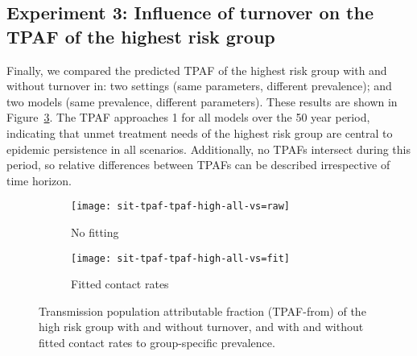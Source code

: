 \subsection{Experiment 3: Influence of turnover on the TPAF of the highest risk group}
\label{ss:res-tpaf}
Finally, we compared the predicted TPAF of the highest risk group with and without turnover in:
two settings (same parameters, different prevalence); and
two models (same prevalence, different parameters).
These results are shown in Figure~\ref{fig:tpaf}.
The TPAF approaches 1 for all models over the 50 year period,
indicating that unmet treatment needs of the highest risk group
are central to epidemic persistence in all scenarios.
Additionally, no TPAFs intersect during this period,
so relative differences between TPAFs can be described irrespective of time horizon.
\begin{figure}[!tbp]
  \centering
  \begin{subfigure}{0.45\linewidth}
    \centering
    \texttt{[image: sit-tpaf-tpaf-high-all-vs=raw]}
    \caption{No fitting}
    \label{fig:tpaf-raw}
  \end{subfigure}
  \begin{subfigure}{0.45\linewidth}
    \centering
    \texttt{[image: sit-tpaf-tpaf-high-all-vs=fit]}
    \caption{Fitted contact rates}
    \label{fig:tpaf-fit}
  \end{subfigure}
  \caption{Transmission population attributable fraction (TPAF-from)
    of the high risk group with and without turnover,
    and with and without fitted contact rates to group-specific prevalence.}
  \label{fig:tpaf}
\end{figure}
